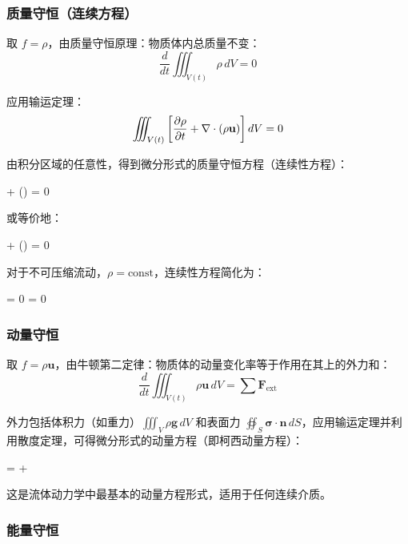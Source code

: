 \subsubsection{质量守恒（连续方程）}

取 \(f = \rho\)，由质量守恒原理：物质体内总质量不变：
\[
\frac{d}{dt}\iiint_{V(t)} \rho \, dV = 0
\]

应用输运定理：
\[
\iiint_{V(t)} \left[\frac{\partial\rho}{\partial t} + \nabla\cdot(\rho\mathbf{u})\right] dV = 0
\]

由积分区域的任意性，得到微分形式的质量守恒方程（连续性方程）：

\begin{myformula}
 + \Nabla\cdot(\rho{}) = 0
\end{myformula}

或等价地：
\begin{myformula}
 + \rho(\Nabla\cdot{}) = 0
\end{myformula}

对于不可压缩流动，\(\rho = \text{const}\)，连续性方程简化为：

\begin{myformula}
\Nabla\cdot{} = 0 \quad {} \quad {} = 0
\end{myformula}

\subsubsection{动量守恒}

取 \(f = \rho \mathbf{u}\)，由牛顿第二定律：物质体的动量变化率等于作用在其上的外力和：
\[
\frac{d}{dt}\iiint_{V(t)} \rho\mathbf{u} \, dV = \sum \mathbf{F}_{\text{ext}}
\]

外力包括体积力（如重力）\(\iiint_{V} \rho \mathbf{g} \, dV\) 和表面力 \(\oiint_{S} \boldsymbol{\sigma}\cdot\mathbf{n} \, dS\)，应用输运定理并利用散度定理，可得微分形式的动量方程（即柯西动量方程）：

\begin{myformula}
\rho{} = \Nabla\cdot\boldsymbol{\sigma} + \rho{}
\end{myformula}

这是流体动力学中最基本的动量方程形式，适用于任何连续介质。

\subsubsection{能量守恒}

